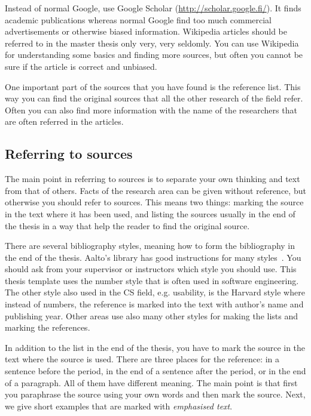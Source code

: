 \documentclass[12pt,a4paper,oneside,pdftex]{report}
\begin{document}
Instead of normal Google, use Google Scholar
(\url{http://scholar.google.fi/}). It finds academic publications whereas
normal Google find too much commercial advertisements or otherwise
biased information. Wikipedia articles should be referred to in the master
thesis only very, very seldomly. You can use Wikipedia for understanding
some basics and finding more sources, but often you cannot be sure if
the article is correct and unbiased.

One important part of the sources that you have found is the reference
list. This way you can find the original sources that all the other
research of the field refer. Often you can also find more information
with the name of the researchers that are often referred in the
articles.

\subsection{Referring to sources}

The main point in referring to sources is to separate your own
thinking and text from that of others. Facts of the research area can
be given without reference, but otherwise you should refer to
sources. This means two things: marking the source in the text where
it has been used, and listing the sources usually in the end of the
thesis in a way that help the reader to find the original source.

There are several bibliography styles, meaning how to form the
bibliography in the end of the thesis. Aalto's library has good
instructions for many styles~\cite{bibinstructions}. You should ask
from your supervisor or instructors which style you should use. This
thesis template uses the number style that is often used in software
engineering. The other style also used in the CS field,
e.g. usability, is the Harvard style where instead of numbers, the
reference is marked into the text with author's name and publishing
year. Other areas use also many other styles for making the lists and
marking the references.

In addition to the list in the end of the thesis, you have to mark the
source in the text where the source is used. There are three places
for the reference: in a sentence before the period, in the end of a
sentence after the period, or in the end of a paragraph. All of them
have different meaning. The main point is that first you paraphrase
the source using your own words and then mark the source. Next, we
give short examples that are marked with \emph{emphasised text}.
\end{document}
